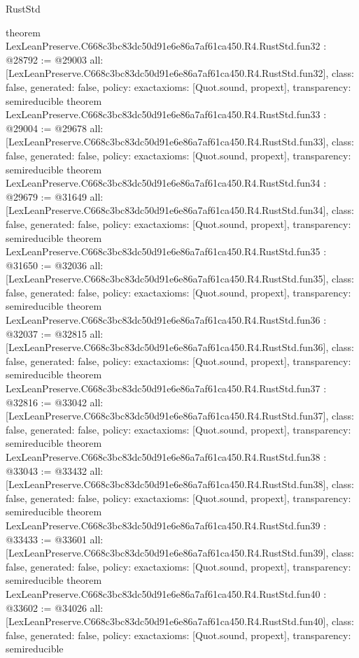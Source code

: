 \begin{lexlean}{RustStd}
\begin{coremodule}
{}
theorem LexLeanPreserve.C668c3bc83dc50d91e6e86a7af61ca450.R4.RustStd.fun32 : @28792 := @29003 {
  all: [LexLeanPreserve.C668c3bc83dc50d91e6e86a7af61ca450.R4.RustStd.fun32],
  class: false,
  generated: false,
  policy: exact{axioms: [Quot.sound, propext]},
  transparency: semireducible
}
theorem LexLeanPreserve.C668c3bc83dc50d91e6e86a7af61ca450.R4.RustStd.fun33 : @29004 := @29678 {
  all: [LexLeanPreserve.C668c3bc83dc50d91e6e86a7af61ca450.R4.RustStd.fun33],
  class: false,
  generated: false,
  policy: exact{axioms: [Quot.sound, propext]},
  transparency: semireducible
}
theorem LexLeanPreserve.C668c3bc83dc50d91e6e86a7af61ca450.R4.RustStd.fun34 : @29679 := @31649 {
  all: [LexLeanPreserve.C668c3bc83dc50d91e6e86a7af61ca450.R4.RustStd.fun34],
  class: false,
  generated: false,
  policy: exact{axioms: [Quot.sound, propext]},
  transparency: semireducible
}
theorem LexLeanPreserve.C668c3bc83dc50d91e6e86a7af61ca450.R4.RustStd.fun35 : @31650 := @32036 {
  all: [LexLeanPreserve.C668c3bc83dc50d91e6e86a7af61ca450.R4.RustStd.fun35],
  class: false,
  generated: false,
  policy: exact{axioms: [Quot.sound, propext]},
  transparency: semireducible
}
theorem LexLeanPreserve.C668c3bc83dc50d91e6e86a7af61ca450.R4.RustStd.fun36 : @32037 := @32815 {
  all: [LexLeanPreserve.C668c3bc83dc50d91e6e86a7af61ca450.R4.RustStd.fun36],
  class: false,
  generated: false,
  policy: exact{axioms: [Quot.sound, propext]},
  transparency: semireducible
}
theorem LexLeanPreserve.C668c3bc83dc50d91e6e86a7af61ca450.R4.RustStd.fun37 : @32816 := @33042 {
  all: [LexLeanPreserve.C668c3bc83dc50d91e6e86a7af61ca450.R4.RustStd.fun37],
  class: false,
  generated: false,
  policy: exact{axioms: [Quot.sound, propext]},
  transparency: semireducible
}
theorem LexLeanPreserve.C668c3bc83dc50d91e6e86a7af61ca450.R4.RustStd.fun38 : @33043 := @33432 {
  all: [LexLeanPreserve.C668c3bc83dc50d91e6e86a7af61ca450.R4.RustStd.fun38],
  class: false,
  generated: false,
  policy: exact{axioms: [Quot.sound, propext]},
  transparency: semireducible
}
theorem LexLeanPreserve.C668c3bc83dc50d91e6e86a7af61ca450.R4.RustStd.fun39 : @33433 := @33601 {
  all: [LexLeanPreserve.C668c3bc83dc50d91e6e86a7af61ca450.R4.RustStd.fun39],
  class: false,
  generated: false,
  policy: exact{axioms: [Quot.sound, propext]},
  transparency: semireducible
}
theorem LexLeanPreserve.C668c3bc83dc50d91e6e86a7af61ca450.R4.RustStd.fun40 : @33602 := @34026 {
  all: [LexLeanPreserve.C668c3bc83dc50d91e6e86a7af61ca450.R4.RustStd.fun40],
  class: false,
  generated: false,
  policy: exact{axioms: [Quot.sound, propext]},
  transparency: semireducible
}
\end{coremodule}
\end{lexlean}
